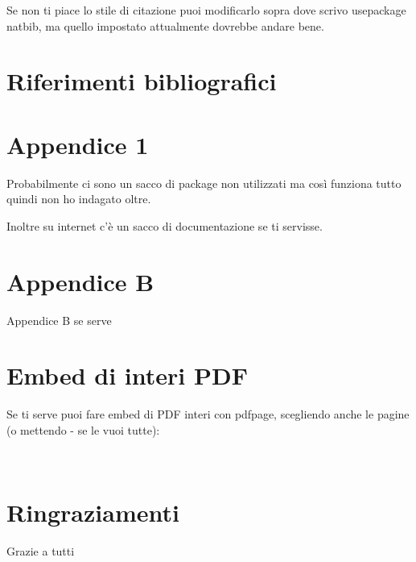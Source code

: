 \documentclass[12pt,a4paper,twoside]{book}
\begin{document}
Se non ti piace lo stile di citazione puoi modificarlo sopra dove scrivo usepackage natbib, ma quello impostato attualmente dovrebbe andare bene.



\renewcommand{\bibsection}{}
\chapter*{Riferimenti bibliografici}

\newpage

\renewcommand{\appendixtocname}{Appendici}
\renewcommand{\appendixpagename}{Appendici}
{}
\begin{appendices}
\chapter{Appendice 1}
\label{Appendice:A}
Probabilmente ci sono un sacco di package non utilizzati ma così funziona tutto quindi non ho indagato oltre.

Inoltre su internet c'è un sacco di documentazione se ti servisse.
\chapter{Appendice B}
\label{Appendice:B}
Appendice B se serve

\chapter{Embed di interi PDF}
\label{Appendice:C}
Se ti serve puoi fare embed di PDF interi con pdfpage, scegliendo anche le pagine (o mettendo - se le vuoi tutte):


\end{appendices}

\newpage~\newpage
\chapter*{Ringraziamenti}
Grazie a tutti
\end{document}
